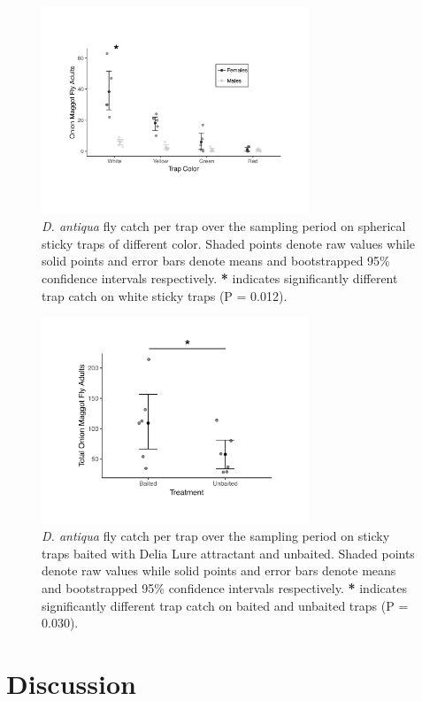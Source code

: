 \documentclass[alpha-refs]{wiley-article}
\begin{document}
\begin{figure}[bt]
\centering
\includegraphics[width = 8cm]{figures/publication/figure-3.pdf}
\caption{\textit{D. antiqua} fly catch per trap over the sampling period on spherical sticky traps of different color.  Shaded points denote raw values while solid points and error bars denote means and bootstrapped 95\% confidence intervals respectively.  \textbf{*} indicates significantly different trap catch on white sticky traps (P = 0.012).}
\label{fig:figure3}
\end{figure}


\begin{figure}[bt]
\centering
\includegraphics[width = 8cm]{figures/publication/figure-4.pdf}
\caption{\textit{D. antiqua} fly catch per trap over the sampling period on sticky traps baited with Delia Lure attractant and unbaited.  Shaded points denote raw values while solid points and error bars denote means and bootstrapped 95\% confidence intervals respectively.  \textbf{*} indicates significantly different trap catch on baited and unbaited traps (P = 0.030). }
\label{fig:figure4}
\end{figure}


\section{Discussion}
\end{document}
